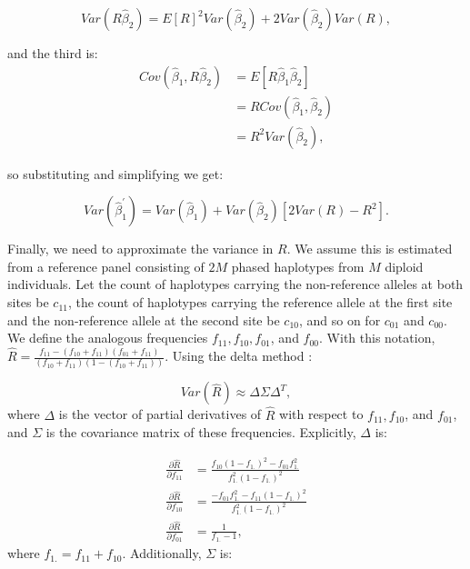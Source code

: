 \documentclass[11pt,titlepage]{article}
\begin{document}
\begin{equation}
Var(R \hat \beta_2) = E[R]^2 Var( \hat \beta_2) + 2 Var(\hat \beta_2) Var(R),
\end{equation}

\noindent and the third is:
\begin{align}
Cov (\hat \beta_1, R \hat \beta_2) &= E[ R  \hat \beta_1 \hat \beta_2]\\
& = R Cov (\hat \beta_1, \hat \beta_2)\\
& = R^2 Var(\hat \beta_2),
\end{align}

\noindent so substituting and simplifying we get:

\begin{equation} \label{varB}
Var(\hat \beta_1^{\prime}) = Var(\hat \beta_1) + Var(\hat \beta_2) [2 Var(R)- R^2].
\end{equation}

Finally, we need to approximate the variance in $R$. We assume this is estimated from a reference panel consisting of $2M$ phased haplotypes from $M$ diploid individuals. Let the count of haplotypes carrying the non-reference alleles at both sites be $c_{11}$, the count of haplotypes carrying the reference allele at the first site and the non-reference allele at the second site be $c_{10}$, and so on for $c_{01}$ and $c_{00}$. We define the analogous frequencies $f_{11}, f_{10}, f_{01}$, and $f_{00}$. With this notation, $\hat R = \frac{f_{11} - (f_{10}+f_{11})(f_{01}+f_{11})}{ (f_{10}+f_{11})(1-(f_{10}+f_{11}))}$.   Using the delta method \citep{Agresti:2002vk}:  

\begin{equation}
Var (\hat R) \approx \Delta \Sigma \Delta^{T},
\end{equation} 
\noindent where $\Delta$ is the vector of partial derivatives of $\hat R$ with respect to $f_{11}, f_{10}$, and  $f_{01}$, and $\Sigma$ is the covariance matrix of these frequencies. Explicitly, $\Delta$ is:

\begin{align}
\frac{\partial \hat R}{\partial f_{11}} &= \frac{f_{10} (1-f_{1.})^2 - f_{01} f_{1.}^2}{f_{1.}^2 (1-f_{1.})^2}  \\
 \frac{\partial \hat R}{\partial f_{10}} &= \frac{-f_{01}f_{1.}^2 - f_{11} (1-f_{1.})^2}{f_{1.}^2 (1-f_{1.})^2}\\
 \frac{\partial \hat R}{\partial f_{01}} &= \frac{1}{f_{1.}-1}, 
\end{align}
\noindent where $f_{1.} = f_{11}+f_{10}$. Additionally, $\Sigma$ is:
\end{document}
